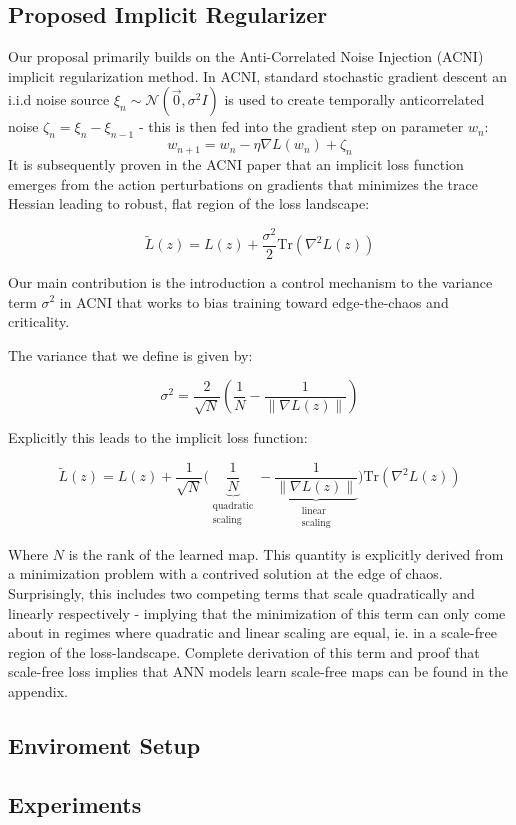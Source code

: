 \subsection{Proposed Implicit Regularizer}

Our proposal primarily builds on the Anti-Correlated Noise Injection (ACNI) implicit regularization method\cite{orvieto2022anticorrelated}. In ACNI, standard stochastic gradient descent an i.i.d noise source $\xi_n\sim \mathcal{N}(\vec{0},\sigma^2 I)$ is used to create temporally anticorrelated noise $\zeta_n=\xi_n-\xi_{n-1}$ - this is then fed into the gradient step on parameter $w_n$:
\begin{equation}
w_{n+1} = w_n - \eta\nabla L(w_n)+\zeta_n
\end{equation}
It is subsequently proven in the ACNI paper that an implicit loss function emerges from the action perturbations on gradients that minimizes the trace Hessian leading to robust, flat region of the loss landscape:

\begin{equation}
\tilde{L}(z)= L(z)+\dfrac{\sigma^2}{2}\text{Tr}(\nabla^2L(z))
\end{equation}

Our main contribution is the introduction a control mechanism to the variance term $\sigma^2$ in ACNI that works to bias training toward edge-the-chaos and criticality.

The variance that we define is given by:

\begin{equation}
\sigma^2 = \dfrac{2}{\sqrt{N}}\left(\dfrac{1}{N}-\dfrac{1}{\|{\nabla L(z)}\|}\right)
\end{equation}

Explicitly this leads to the implicit loss function:

\begin{equation}
\tilde{L}(z)= L(z)+\dfrac{1}{\sqrt{N}}\bigg(\underbrace{\dfrac{1}{N}}_{\substack{\text{quadratic} \\ \text{scaling}}}-\underbrace{\dfrac{1}{\|{\nabla L(z)}\|}}_{\substack{\text{linear} \\ \text{scaling}}}\bigg)\text{Tr}(\nabla^2L(z))
\end{equation}
    
Where $N$ is the rank of the learned map. This quantity is explicitly derived from a minimization problem with a contrived solution at the edge of chaos. Surprisingly, this includes two competing terms that scale quadratically and linearly respectively - implying that the minimization of this term can only come about in regimes where quadratic and linear scaling are equal, ie. in a scale-free region of the loss-landscape. Complete derivation of this term and proof that scale-free loss implies that ANN models learn scale-free maps can be found in the appendix.

\subsection{Enviroment Setup}


\subsection{Experiments}